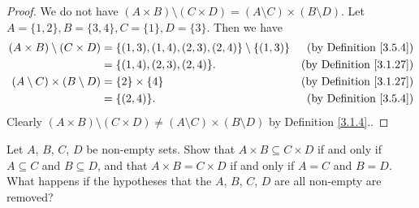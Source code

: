 \begin{proof}
We do not have \((A \times B) \setminus (C \times D) = (A \setminus C) \times (B \setminus D)\).
Let \(A = \{1, 2\}, B = \{3, 4\}, C = \{1\}, D = \{3\}\).
Then we have
\begin{align*}
(A \times B) \setminus (C \times D) &= \{(1, 3), (1, 4), (2, 3), (2, 4)\} \setminus \{(1, 3)\} & \text{(by Definition \ref{3.5.4})} \\
&= \{(1, 4), (2, 3), (2, 4)\}. & \text{(by Definition \ref{3.1.27})} \\
(A \setminus C) \times (B \setminus D) &= \{2\} \times \{4\} & \text{(by Definition \ref{3.1.27})} \\
&= \{(2, 4)\}. & \text{(by Definition \ref{3.5.4})}
\end{align*}
Clearly \((A \times B) \setminus (C \times D) \neq (A \setminus C) \times (B \setminus D)\) by Definition \ref{3.1.4}..
\end{proof}

\begin{exercise}\label{ex 3.5.6}
Let \(A\), \(B\), \(C\), \(D\) be non-empty sets.
Show that \(A \times B \subseteq C \times D\) if and only if \(A \subseteq C\) and \(B \subseteq D\), and that \(A \times B = C \times D\) if and only if \(A = C\) and \(B = D\).
What happens if the hypotheses that the \(A\), \(B\), \(C\), \(D\) are all non-empty are removed?
\end{exercise}

